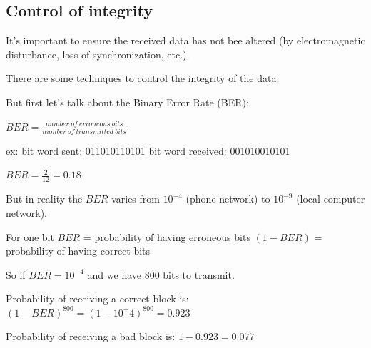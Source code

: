\documentclass{beamer}[10pt, usepdftitle=false, handout]
\begin{document}
	\subsection{Control of integrity}

	\begin{frame}
	
	It's important to ensure the received data has not bee altered (by electromagnetic disturbance, loss of synchronization, etc.).
	\vspace*{0.5em} 
	
	There are some techniques to control the integrity of the data. 
	\vspace*{0.5em}
	
	But first let's talk about the Binary Error Rate (BER):
	\vspace*{1em}
	
	$BER = \frac{number\ of\ erroneous\ bits}{number\ of\ transmitted\ bits}$
	\vspace*{0.5em}
	
	ex:
	bit word sent:     011010110101
	bit word received: 001010010101	
	\vspace*{1em}
	
	$BER=\frac{2}{12}=0.18$	
	\vspace*{0.5em}	
		
	But in reality 	the $BER$ varies from $10^{-4}$ (phone network) to $10^{-9}$ (local computer network).
	
	\end{frame}

	\begin{frame}
	
	For one bit $BER$ = probability of having erroneous bits
	$(1-BER)$ = probability of having correct bits
	\vspace*{1em}
	
	So if $BER=10^{-4}$ and we have 800 bits to transmit.
	\vspace*{1em}
	
	Probability of receiving a correct block is:
	$(1-BER)^{800}=(1-10^-4)^{800}=0.923$
	\vspace*{1em}
	
	Probability of receiving a bad block is:
	$1-0.923=0.077$	
	 	
	\end{frame}
\end{document}

